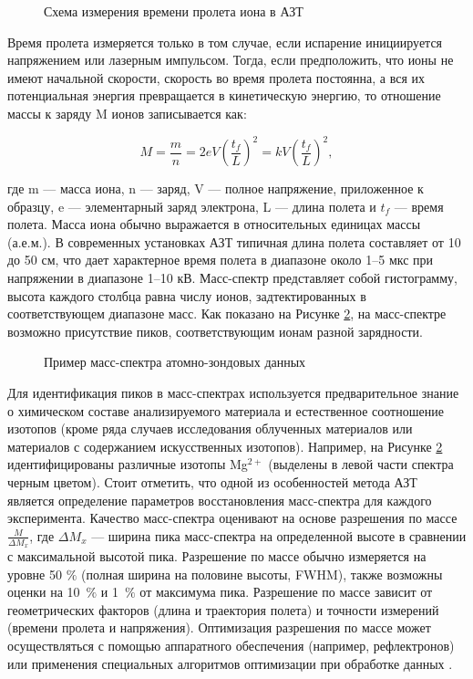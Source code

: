 \begin{figure}[htb]
	\caption{Схема измерения времени пролета иона в АЗТ \cite{Vurpillot16}}
	\label{fig:time_flight}
\end{figure} 

Время пролета измеряется только в том случае, если испарение инициируется напряжением или лазерным импульсом. Тогда, если предположить, что ионы не имеют начальной скорости, скорость во время пролета постоянна, а вся их потенциальная энергия превращается в кинетическую энергию, то отношение массы к заряду M ионов записывается как:

\begin{equation}
	\label{eq:equation8}
	M = \frac{m}{n} = 2eV(\frac{t_f}{L})^2 = kV(\frac{t_f}{L})^2,
\end{equation}

где m — масса иона, n — заряд, V — полное напряжение, приложенное к образцу, e — элементарный заряд электрона, L — длина полета и $t_f$ — время полета. Масса иона обычно выражается в относительных единицах массы (а.е.м.). В современных установках АЗТ типичная длина полета составляет от 10 до 50 см, что дает характерное время полета в диапазоне около 1–5 мкс при напряжении в диапазоне 1–10 кВ.
Масс-спектр представляет собой гистограмму, высота каждого столбца равна числу ионов, задтектированных в соответствующем диапазоне масс. Как показано на Рисунке \cref{fig:mass_spectr}, на масс-спектре возможно присутствие пиков, соответствующим ионам разной зарядности.

\begin{figure}[ht]
	\caption{Пример масс-спектра атомно-зондовых данных \cite{scbibAlumYAFI}}
	\label{fig:mass_spectr}
\end{figure} 

Для идентификация пиков в масс-спектрах используется предварительное знание о химическом составе  анализируемого материала и естественное соотношение изотопов (кроме ряда случаев исследования облученных материалов или материалов с содержанием искусственных изотопов). Например, на Рисунке \cref{fig:mass_spectr} идентифицированы различные изотопы Mg$^{2+}$ (выделены в левой части спектра черным цветом). Стоит отметить, что одной из особенностей метода АЗТ является определение параметров восстановления масс-спектра для каждого эксперимента. Качество масс-спектра оценивают на основе разрешения по массе $\frac{M}{\Delta M_x}$, где $\Delta M_x$ — ширина пика масс-спектра на определенной высоте в сравнении с максимальной высотой пика. Разрешение по массе обычно измеряется на уровне 50 $\%$ (полная ширина на половине высоты, FWHM), также возможны оценки на 10 $\%$ и 1 $\%$ от максимума пика. Разрешение по массе зависит от геометрических факторов (длина и траектория полета) и точности измерений (времени пролета и напряжения). Оптимизация разрешения по массе может осуществляться с помощью аппаратного обеспечения (например, рефлектронов) или применения специальных алгоритмов оптимизации при обработке данных \cite{Shutov19}.

